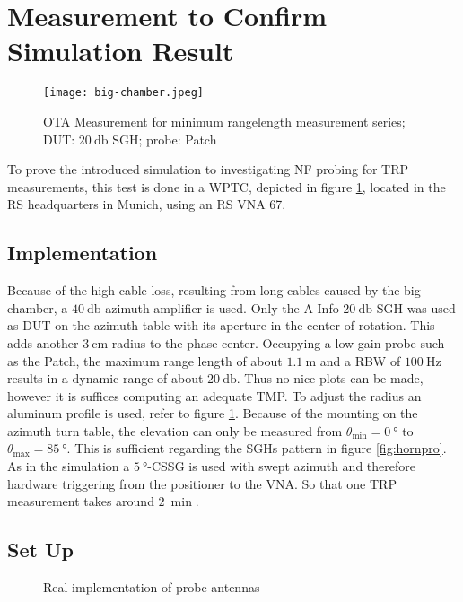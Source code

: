 \section{Measurement to Confirm Simulation Result}

\begin{figure}[H]
\centering
\texttt{[image: big-chamber.jpeg]}
\caption{OTA Measurement for minimum rangelength measurement series; DUT: $\SI{20}{\decibel}$ SGH; probe: Patch}
\label{fig:otameas}
\end{figure}

To prove the introduced simulation to investigating \ac{NF} probing for \ac{TRP} measurements, this test is done in a \ac{WPTC}, depicted in figure \ref{fig:otameas}, located in the \ac{RS} headquarters in Munich, using an \ac{RS} \ac{VNA} 67.

\subsection{Implementation}

Because of the high cable loss, resulting from long cables caused by the big chamber, a $\SI{40}{\decibel}$ azimuth amplifier is used.
Only the A-Info $\SI{20}{\decibel}$ \ac{SGH} was used as \ac{DUT} on the azimuth table with its aperture in the center of rotation.
This adds another $\SI{3}{\centi\meter}$ radius to the phase center. Occupying a low gain probe such as the Patch, the maximum range length of about $\SI{1.1}{\meter}$ and a \ac{RBW} of $\SI{100}{\hertz}$ results in a dynamic range of about $\SI{20}{\decibel}$.
Thus no nice plots can be made, however it is suffices computing an adequate \ac{TMP}. To adjust the radius an aluminum profile is used, refer to figure \ref{fig:otameas}. Because of the mounting on the azimuth turn table, the elevation can only be measured from $\theta_\text{min}=\SI{0}{\degree}$ to $\theta_\text{max}=\SI{85}{\degree}$. This is sufficient regarding the \ac{SGH}s pattern in figure \ref{fig:hornpro}. As in the simulation a $\SI{5}{\degree}$-\ac{CSSG} is used with swept azimuth and therefore hardware triggering from the positioner to the \ac{VNA}. So that one \ac{TRP} measurement takes around $\SI{2}{\min}$.

\subsection{Set Up}

\begin{figure}[H]
  \centering
  \centering
  \centering
\caption{Real implementation of probe antennas}
\label{fig:realprobe}
\end{figure}

